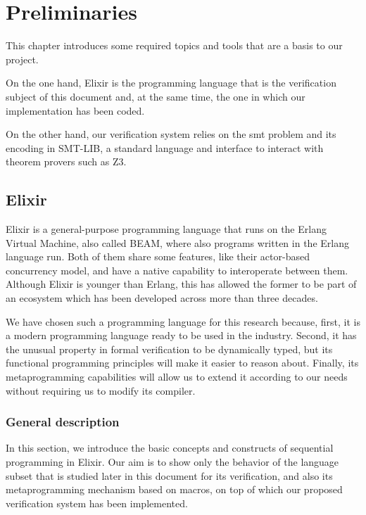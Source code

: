 \chapter{Preliminaries}
\label{cap:preliminaries}

This chapter introduces some required topics and tools that are a basis to our
project.

On the one hand, Elixir is the programming language that is the verification
subject of this document and, at the same time, the one in which our
implementation has been coded.

On the other hand, our verification system relies on the \gls{smt} problem and
its encoding in SMT-LIB, a standard language and interface to interact with
theorem provers such as Z3.

\section{Elixir}

Elixir is a general-purpose programming language that runs on the Erlang Virtual
Machine, also called BEAM, where also programs written in the Erlang language
run. Both of them share some features, like their actor-based concurrency model,
and have a native capability to interoperate between them. Although Elixir is
younger than Erlang, this has allowed the former to be part of an ecosystem
which has been developed across more than three decades.

We have chosen such a programming language for this research because, first, it
is a modern programming language ready to be used in the industry.  Second, it
has the unusual property in formal verification to be dynamically typed, but its
functional programming principles will make it easier to reason about. Finally,
its metaprogramming capabilities will allow us to extend it according to our
needs without requiring us to modify its compiler.

\subsection{General description}

In this section, we introduce the basic concepts and constructs of sequential
programming in Elixir. Our aim is to show only the behavior of the language
subset that is studied later in this document for its verification, and also its
metaprogramming mechanism based on macros, on top of which our proposed
verification system has been implemented.

